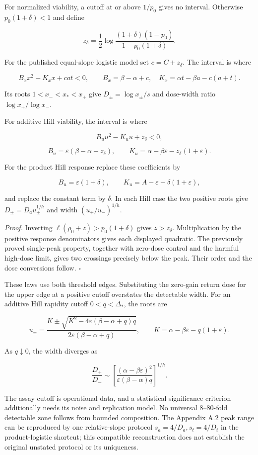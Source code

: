 \documentclass[
  11pt,
  a4paper,
]{article}
\begin{document}
For normalized viability, a cutoff at or above \(1/p_0\) gives no interval. Otherwise \(p_0(1+\delta)<1\) and define

\[z_\delta=\frac12\log\frac{(1+\delta)(1-p_0)}{1-p_0(1+\delta)}.\]

For the published equal-slope logistic model set \(c=C+z_\delta\). The interval is where

\[B_xx^2-K_xx+cat<0,\qquad
B_x=\beta-\alpha+c,\quad K_x=\alpha t-\beta a-c(a+t).\]

Its roots \(1<x_-<x_*<x_+\) give \(D_\pm=\log x_\pm/s\) and dose-width ratio \(\log x_+/\log x_-\).

For additive Hill viability, the interval is where

\[B_uu^2-K_uu+z_\delta<0,\]

\[B_u=\varepsilon(\beta-\alpha+z_\delta),\qquad
K_u=\alpha-\beta\varepsilon-z_\delta(1+\varepsilon).\]

For the product Hill response replace these coefficients by

\[B_u=\varepsilon(1+\delta),\qquad
K_u=A-\varepsilon-\delta(1+\varepsilon),\]

and replace the constant term by \(\delta\). In each Hill case the two positive roots give \(D_\pm=D_au_\pm^{1/h}\) and width \((u_+/u_-)^{1/h}\).

\emph{Proof.} Inverting \(\ell(\rho_0+z)>p_0(1+\delta)\) gives \(z>z_\delta\). Multiplication by the positive response denominators gives each displayed quadratic. The previously proved single-peak property, together with zero-dose control and the harmful high-dose limit, gives two crossings precisely below the peak. Their order and the dose conversions follow. \(\square\)

These laws use both threshold edges. Substituting the zero-gain return dose for the upper edge at a positive cutoff overstates the detectable width. For an additive Hill rapidity cutoff \(0<q<\Delta_*\), the roots are

\[u_\pm=\frac{K\pm\sqrt{K^2-4\varepsilon(\beta-\alpha+q)q}}
{2\varepsilon(\beta-\alpha+q)},\qquad
K=\alpha-\beta\varepsilon-q(1+\varepsilon).\]

As \(q\downarrow0\), the width diverges as

\[\frac{D_+}{D_-}\sim
\left[\frac{(\alpha-\beta\varepsilon)^2}{\varepsilon(\beta-\alpha)q}\right]^{1/h}.\]

The assay cutoff is operational data, and a statistical significance criterion additionally needs its noise and replication model. No universal 8--80-fold detectable zone follows from bounded composition. The Appendix A.2 peak range can be reproduced by one relative-slope protocol \(s_a=4/D_a,s_t=4/D_t\) in the product-logistic shortcut; this compatible reconstruction does not establish the original unstated protocol or its uniqueness.
\end{document}
